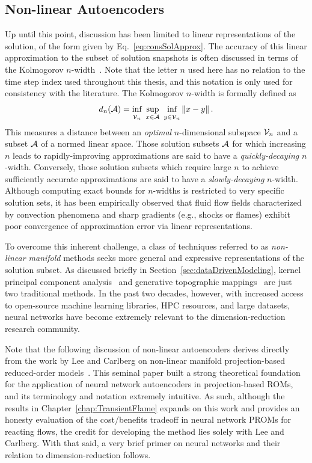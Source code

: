 \subsection{Non-linear Autoencoders}\label{subsec:nonlinManifold}

Up until this point, discussion has been limited to linear representations of the solution, of the form given by Eq.~\ref{eq:consSolApprox}. The accuracy of this linear approximation to the subset of solution snapshots is often discussed in terms of the Kolmogorov $n$-width~\cite{Pinkus1985}. Note that the letter $n$ used here has no relation to the time step index used throughout this thesis, and this notation is only used for consistency with the literature. The Kolmogorov $n$-width is formally defined as
%
\begin{equation}\label{eq:nwidth}
    d_n(\mathcal{A}) = \underset{\mathcal{V}_n}{\vphantom{sup}\text{inf}} \enspace \underset{x \in \mathcal{A}}{\text{sup}} \enspace \underset{y \in \mathcal{V}_n}{\vphantom{sup}\text{inf}} \left\Vert x - y \right\Vert.
\end{equation}
%
This measures a distance between an \textit{optimal} $n$-dimensional subspace $\mathcal{V}_n$ and a subset $\mathcal{A}$ of a normed linear space. Those solution subsets $\mathcal{A}$ for which increasing $n$ leads to rapidly-improving approximations are said to have a \textit{quickly-decaying} $n$-width. Conversely, those solution subsets which require large $n$ to achieve sufficiently accurate approximations are said to have a \textit{slowly-decaying} $n$-width. Although computing exact bounds for $n$-widths is restricted to very specific solution sets, it has been empirically observed that fluid flow fields characterized by convection phenomena and sharp gradients (e.g., shocks or flames) exhibit poor convergence of approximation error via linear representations.

To overcome this inherent challenge, a class of techniques referred to as \textit{non-linear manifold} methods seeks more general and expressive representations of the solution subset. As discussed briefly in Section~\ref{sec:dataDrivenModeling}, kernel principal component analysis~\cite{kernelPCA} and generative topographic mappings~\cite{Bishop1997} are just two traditional methods. In the past two decades, however, with increased access to open-source machine learning libraries, HPC resources, and large datasets, neural networks have become extremely relevant to the dimension-reduction research community.

Note that the following discussion of non-linear autoencoders derives directly from the work by Lee and Carlberg on non-linear manifold projection-based reduced-order models~\cite{Lee2020}. This seminal paper built a strong theoretical foundation for the application of neural network autoencoders in projection-based ROMs, and its terminology and notation extremely intuitive. As such, although the results in Chapter~\ref{chap:TransientFlame} expands on this work and provides an honesty evaluation of the cost/benefits tradeoff in neural network PROMs for reacting flows, the credit for developing the method lies solely with Lee and Carlberg. With that said, a very brief primer on neural networks and their relation to dimension-reduction follows.

